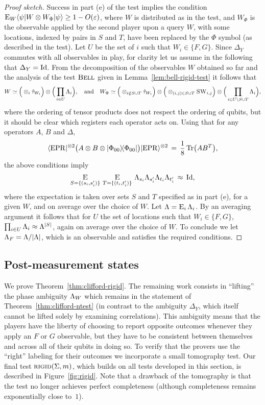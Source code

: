 \begin{proof}[Proof sketch]
Success in part (e) of the test implies the condition $ \mathop{\textsc{E}}_{W} \langle\psi| W
  \otimes W_\Phi |\psi\rangle \geq 1-O(\varepsilon)$, where $W$ is distributed as in the
  test, and $W_{\Phi}$ is the observable applied by the second player upon a
  query $W$, with some locations, indexed by pairs in $S$ and $T$, have been
  replaced by the $\Phi$ symbol (as described in the test). Let $U$ be the set of $i$ such that $W_i\in \{F,G\}$. Since $\Delta_Y$ commutes with all observables in play, for clarity let us assume in the following that $\Delta_Y = \mathop{\rm Id}\nolimits$. 
From the decomposition of the observables $W$ obtained so far and the analysis of the test $\textsc{Bell}$ given in Lemma~\ref{lem:bell-rigid-test} it follows that 
$$W \simeq \Big(\otimes_i {\hat{\tau}_{W_i}} \Big)\otimes \Big(\prod_{i\in U} \Lambda_i\Big),\quad\text{and}\quad W_\Phi \simeq  \Big(\otimes_{i\notin S\cup T} {\hat{\tau}_{W_i}}\Big)\otimes\Big( \otimes_{(i,j)\in S\cup T} \textsc{SW}_{i,j} \Big)\otimes \Big(\prod_{i\in U\backslash S\cup T} \Lambda_i\Big),$$
where the ordering of tensor products does not respect the ordering of qubits, but it should be clear which registers each operator acts on. Using that for any operators $A$, $B$ and $\Delta$, 
$$\langle{\rm EPR}|^{\otimes 2}  \big(A \otimes B \otimes |\Phi_{00}\rangle\!\langle\Phi_{00}|\big)|{\rm EPR}\rangle^{\otimes 2}  \,=\, \frac{1}{8}\,\mbox{\rm Tr}\big(AB^T\big) ,$$
the above conditions imply 
$$\mathop{\textsc{E}}_{S=\{(s_i,s'_i)\}}\, \mathop{\textsc{E}}_{T=\{(t_i,t'_i)\}} \, \Lambda_{s_i}\Lambda_{s'_i} \Lambda_{t_i}\Lambda_{t'_i} \,\approx\, \mathop{\rm Id}\nolimits,$$
where the expectation is taken over sets $S$ and $T$ specified as in part (e), for a given $W$, and on average over the choice of $W$. Let $\Lambda = \mathop{\textsc{E}}_{i} \Lambda_i$. By an averaging argument it follows that for $U$ the set of locations such that $W_i \in \{F,G\}$, $\prod_{i\in U} \Lambda_i \approx \Lambda^{|S|}$, again on average over the choice of $W$. To conclude we let $\Lambda_F = \Lambda/|\Lambda|$, which is an observable and satisfies the required conditions. 
\end{proof}


\subsection{Post-measurement states}
\label{sec: RIGID test}

We prove Theorem~\ref{thm:clifford-rigid}. The remaining work consists in ``lifting'' the phase ambiguity $\Lambda_W$ which remains in the statement of Theorem~\ref{thm:clifford-ntest} (in contrast to the ambiguity $\Delta_Y$, which itself cannot be lifted solely by examining correlations). This ambiguity means that the players have the liberty of choosing to report opposite outcomes whenever they apply an $F$ or $G$ observable, but they have to be consistent between themselves and across all of their qubits in doing so. To verify that the provers use the ``right'' labeling for their outcomes we  incorporate a small tomography test. Our final test  $\textsc{rigid}(\Sigma,m)$, which builds on all tests developed in this section, is described in Figure~\ref{fig:rigid}. Note that a drawback of the tomography is that the test no longer achieves perfect completeness (although completeness remains exponentially close to~$1$). 

